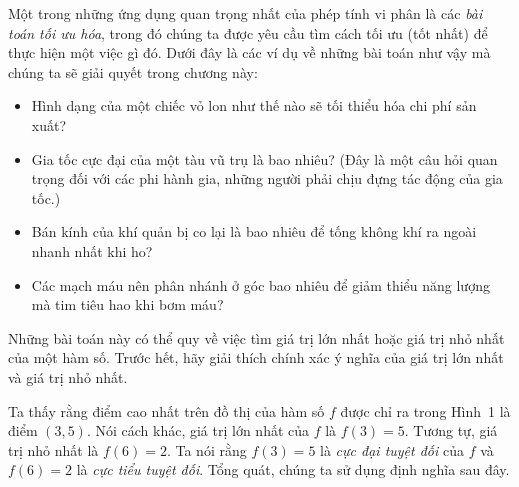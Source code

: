 \begin{minipage}[t]{131mm}
  \noindent
  Một trong những ứng dụng quan trọng nhất của phép tính vi phân là các \emph{bài toán tối ưu hóa}, trong đó chúng ta được yêu cầu tìm cách tối ưu (tốt nhất) để thực hiện một việc gì đó. Dưới đây là các ví dụ về những bài toán như vậy mà chúng ta sẽ giải quyết trong chương này:

  \begin{itemize}[leftmargin=1.2em, itemsep=2pt, topsep=3pt, parsep=0pt]
    \item[\textcolor{defred}{\textbullet}] Hình dạng của một chiếc vỏ lon như thế nào sẽ tối thiểu hóa chi phí sản xuất?
    \item[\textcolor{defred}{\textbullet}] Gia tốc cực đại của một tàu vũ trụ là bao nhiêu? (Đây là một câu hỏi quan trọng đối với các phi hành gia, những người phải chịu đựng tác động của gia tốc.)
    \item[\textcolor{defred}{\textbullet}] Bán kính của khí quản bị co lại là bao nhiêu để tống không khí ra ngoài nhanh nhất khi ho?
    \item[\textcolor{defred}{\textbullet}] Các mạch máu nên phân nhánh ở góc bao nhiêu để giảm thiểu năng lượng mà tim tiêu hao khi bơm máu?
  \end{itemize}

  \vspace{3pt}
  \noindent
  Những bài toán này có thể quy về việc tìm giá trị lớn nhất hoặc giá trị nhỏ nhất của một hàm số. Trước hết, hãy giải thích chính xác ý nghĩa của giá trị lớn nhất và giá trị nhỏ nhất.

  \vspace{8pt}
  \noindent
  {\color{stewartteal}\blacksquare}\hspace{0.5em}{\bfseries\sffamily Giá trị cực trị tuyệt đối và địa phương}

  \vspace{3pt}
  \noindent
  Ta thấy rằng điểm cao nhất trên đồ thị của hàm số $f$ được chỉ ra trong Hình~1 là điểm $(3, 5)$. Nói cách khác, giá trị lớn nhất của $f$ là $f(3) = 5$. Tương tự, giá trị nhỏ nhất là $f(6) = 2$. Ta nói rằng $f(3) = 5$ là \emph{cực đại tuyệt đối} của $f$ và $f(6) = 2$ là \emph{cực tiểu tuyệt đối}. Tổng quát, chúng ta sử dụng định nghĩa sau đây.


\end{minipage}

